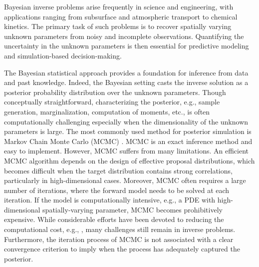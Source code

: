 Bayesian inverse problems arise frequently in science and engineering, with applications ranging from subsurface and atmospheric transport to chemical kinetics. The primary task of such problems is to recover spatially varying unknown parameters from noisy and incomplete observations. Quantifying the uncertainty in the unknown parameters \cite{efendiev2006preconditioning,marzouk2007stochastic,wang2016gaussian,huan2013simulation,li2015adaptive,lieberman2010parameter,cui2016dimension} is then essential for predictive modeling and simulation-based decision-making.

The Bayesian statistical approach provides a foundation for inference from data and past knowledge. Indeed, the Bayesian setting casts the inverse solution as a posterior probability distribution over the unknown parameters. Though conceptually straightforward, characterizing the posterior, e.g., sample generation, marginalization, computation of moments, etc., is often computationally challenging especially when the dimensionality of the unknown parameters is large. 
The most commonly used method for posterior simulation is Markov Chain Monte Carlo (MCMC) \cite{robert1999monte}. MCMC is an exact inference method and easy to implement. However, MCMC suffers from many limitations. An efficient MCMC algorithm depends on the design of effective proposal distributions, which becomes difficult when the target distribution contains strong correlations, particularly in high-dimensional cases.  Moreover, MCMC often requires a large number of iterations, where the forward model needs to be solved at each iteration. If the model is computationally intensive, e.g., a PDE with high-dimensional spatially-varying parameter, MCMC becomes prohibitively expensive.  
While considerable efforts have been
devoted to reducing the computational cost, e.g., \cite{lieberman2010parameter,li2014adaptive,cui2015data,jiang2017multiscale,liao2019adaptive,wang2018adaptive}, many challenges still remain in inverse problems.
Furthermore, the iteration process of MCMC is not associated with a clear convergence criterion to imply when the process has adequately captured the posterior.

